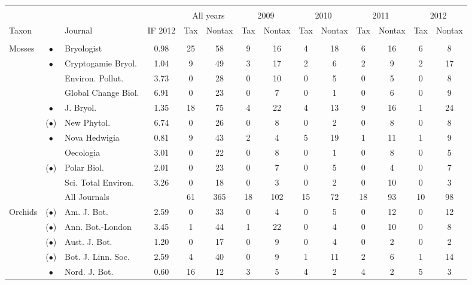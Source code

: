 \documentclass[webpdf,PV,mynatbib,surname,CE,MSC]{SYS-PV}
\begin{document}
\begin{table*}[!p]%
{\tabcolsep=0pt\begin{tabular*}{\textwidth}{@{\extracolsep{\fill}}lclccccccccccc@{}}\toprule&\\
&&&&\multicolumn{2}{c}{All years} &\multicolumn{2}{c}{2009} &\multicolumn{2}{c}{2010}
&\multicolumn{2}{c}{2011} &\multicolumn{2}{c}{2012}
\down\\\cline{4-4}\cline{5-6}\cline{7-8}\cline{9-10}\cline{11-12}\cline{13-14}\up
Taxon& &Journal&IF 2012&Tax&Nontax&Tax&Nontax&Tax&Nontax&Tax&Nontax&Tax&Nontax \\\colrule&\\
Mosses&$\bullet$&Bryologist&0.98&25&58&9&16&4&18&6&16&6&8 \\
& $\bullet$& Cryptogamie Bryol.&1.04& 9& 49& 3& 17& 2& 6&  2& 9& 2&17 \\
~& ~& Environ. Pollut. & 3.73& 0& 28&0& 10&  0& 5& 0& 5& 0&8 \\
~& ~& Global Change Biol.& 6.91& 0& 23&  0& 7&  0& 1&  0& 6& 0&9 \\
~& $\bullet$& J. Bryol.& 1.35&18& 75& 4& 22& 4& 13& 9& 16&  1&24 \\
~& ($\bullet$)& New Phytol.& 6.74& 0& 26&  0& 8& 0& 2& 0& 8& 0&8 \\
~& $\bullet$& Nova Hedwigia& 0.81&  9& 43&  2& 4& 5& 19& 1& 11&  1&9 \\
~& ~& Oecologia & 3.01& 0& 22& 0& 8&  0& 1& 0& 8&  0&5 \\
~& ($\bullet$)& Polar Biol.& 2.01&0& 23&  0& 7&  0& 5&0& 4& 0&7 \\
~& ~& Sci. Total Environ.& 3.26& 0& 18& 0& 3&  0& 2&  0& 10&0&3 \\
\textbf{~}& \textbf{~}& All Journals& ~&  61& 365&18& 102& 15& 72& 18& 93&10&98 \\
Orchids& ($\bullet$)& Am. J. Bot.& 2.59& 0& 33& 0& 4& 0& 5& 0& 12& 0&12 \\
~& ($\bullet$)& Ann. Bot.-London& 3.45&1& 44&  1& 22&  0& 4&  0& 10&  0&8 \\
~& ($\bullet$)& Aust. J. Bot.& 1.20& 0& 17& 0& 9& 0& 4& 0& 2&  0&2 \\
~& ($\bullet$)& Bot. J. Linn. Soc.& 2.59& 4& 40& 0& 9&1& 11&  2& 6&1&14 \\
~& $\bullet$& Nord. J. Bot.& 0.60&  16& 12&  3& 5&4& 2&  4& 2& 5&3 \\

\end{tabular*}}
\end{table*}
\end{document}
